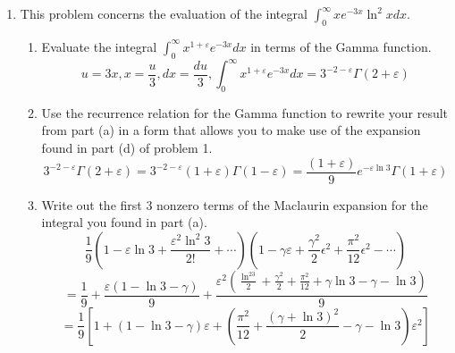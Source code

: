 \documentclass{article}
\begin{document}
\begin{enumerate}
\begin{enumerate}
        \item Argue that there is no substantive difference between performing the maniuplation in part (c) for $\int_{0}^{\infty}x^{\varepsilon}e^{-x}$ and performing that maniuplation for $\int_{0}^{\infty} x^{\varepsilon}e^{-ax}$. Then, use your result from part (f) in conjunction with this fact to evaluate $\int_{0}^{\infty} e^{-5x}\ln ^2 xdx$.
        \\\\
        There is no substantive difference because we see that regardless of the expansion of the $e^{-x}$ term remains independent of the sum.
        \[a = 5, \varepsilon = 2, c_2 = \frac{1}{5} \left( \frac{\zeta(2) + (\gamma + \ln 5)^2}{2}\right)\]
        \[\int_{0}^{\infty}e^{-5x}\ln^2 xdx = 2!\cdot c_2  = \boxed{\frac 1 5 \left(\frac{\pi^2}{6} + (\gamma + \ln 5)^2\right)}\]
    \end{enumerate}
    \item This problem concerns the evaluation of the integral $\int_{0}^{\infty} xe^{-3x}\ln^2xdx$.
    \begin{enumerate}
        \item Evaluate the integral $\int_{0}^{\infty} x^{1+\varepsilon}e^{-3x}dx$ in terms of the Gamma function.
        \\\[u = 3x, x = \frac u 3, dx = \frac{du}{3}, \int_{0}^{\infty} x^{1+\varepsilon}e^{-3x}dx = \boxed{3^{-2-\varepsilon} \Gamma(2+\varepsilon)}\]
        \item Use the recurrence relation for the Gamma function to rewrite your result from part (a) in a form that allows you to make use of the expansion found in part (d) of problem 1.
        \\\[3^{-2-\varepsilon}\Gamma(2+\varepsilon) = 3^{-2 - \varepsilon}(1+\varepsilon)\Gamma(1-\varepsilon) = \boxed{\frac{(1+\varepsilon)}{9}e^{-\varepsilon \ln 3}\Gamma(1+\varepsilon)}\]
        \item Write out the first 3 nonzero terms of the Maclaurin expansion for the integral you found in part (a).
        \\ \[\frac 1 9 (1-\varepsilon\ln 3 + \frac{\varepsilon^2\ln^2 3}{2!} + \cdots)\left(1 - \gamma\varepsilon + \frac{\gamma^2}{2}\epsilon^2 + \frac{\pi^2}{12}\epsilon^2 - \cdots\right)\]
        \[ = \frac 1 9 + \frac{\varepsilon(1 - \ln3 - \gamma)}{9} + \frac{\varepsilon^2(\frac{\ln^23}{2} + \frac{\gamma^2}{2}+\frac{\pi^2}{12}+\gamma\ln 3 - \gamma - \ln 3)}{9} \]
        \[= \boxed{\frac 1 9 \left[ 1 + (1 - \ln 3 - \gamma)\varepsilon + \left(\frac{\pi^2}{12}+\frac{(\gamma+\ln 3)^2}{2} - \gamma - \ln 3\right)\varepsilon^2\right]}\]

\end{enumerate}
\end{enumerate}
\end{document}
